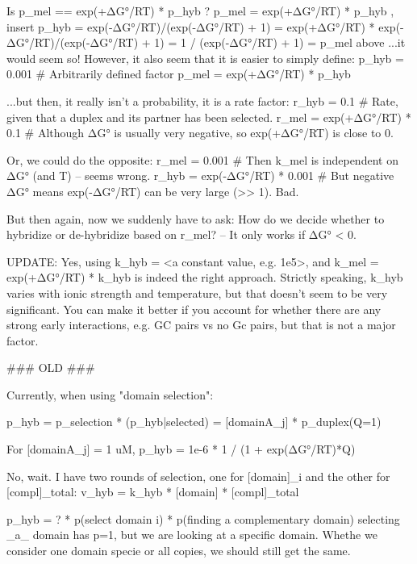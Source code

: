     Is p_mel == exp(+ΔG°/RT) * p_hyb ?
        p_mel = exp(+ΔG°/RT) * p_hyb ,  insert p_hyb = exp(-ΔG°/RT)/(exp(-ΔG°/RT) + 1)
              = exp(+ΔG°/RT) * exp(-ΔG°/RT)/(exp(-ΔG°/RT) + 1)
              = 1 / (exp(-ΔG°/RT) + 1)
              = p_mel above
    ...it would seem so!
    However, it also seem that it is easier to simply define:
        p_hyb = 0.001   # Arbitrarily defined factor
        p_mel = exp(+ΔG°/RT) * p_hyb

    ...but then, it really isn't a probability, it is a rate factor:
        r_hyb = 0.1                         # Rate, given that a duplex and its partner has been selected.
        r_mel = exp(+ΔG°/RT) * 0.1          # Although ΔG° is usually very negative, so exp(+ΔG°/RT) is close to 0.

    Or, we could do the opposite:
        r_mel = 0.001                       # Then k_mel is independent on ΔG° (and T) -- seems wrong.
        r_hyb = exp(-ΔG°/RT) * 0.001        # But negative ΔG° means exp(-ΔG°/RT) can be very large (>> 1). Bad.

    But then again, now we suddenly have to ask:
    How do we decide whether to hybridize or de-hybridize based on r_mel?
    -- It only works if ΔG° < 0.

    UPDATE: Yes, using
        k_hyb = <a constant value, e.g. 1e5>, and
        k_mel = exp(+ΔG°/RT) * k_hyb
    is indeed the right approach.
    Strictly speaking, k_hyb varies with ionic strength and temperature, but that
    doesn't seem to be very significant.
    You can make it better if you account for whether there are any strong early
    interactions, e.g. GC pairs vs no Gc pairs, but that is not a major factor.


    ### OLD ###

    Currently, when using "domain selection":

        p_hyb   = p_selection * (p_hyb|selected)
                = [domainA_j]  * p_duplex(Q=1)

        For [domainA_j] = 1 uM,
            p_hyb = 1e-6 * 1 / (1 + exp(ΔG°/RT)*Q)

    No, wait. I have two rounds of selection, one for [domain]_i and the other for [compl]_total:
        v_hyb = k_hyb * [domain] * [compl]_total

        p_hyb = ? * p(select domain i) * p(finding a complementary domain)
        selecting _a_ domain has p=1, but we are looking at a specific domain. Whethe we consider one domain
        specie or all copies, we should still get the same.



